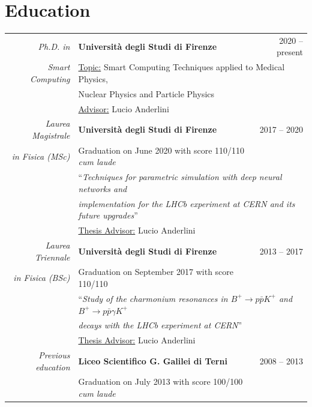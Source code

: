 \documentclass[a4, 11pt]{report}
\begin{document}
    \section*{Education}
        \begin{tabular*}{\textwidth}{rl @{\extracolsep{\fill}} r}
            \textit{Ph.D. in}  
            & {\textbf {Università degli Studi di Firenze}}
            & {\small 2020 -- present}\\
            \textit{Smart Computing}
            & \multicolumn{2}{l}{\small {\ul{Topic:} Smart Computing Techniques applied to Medical Physics,}}\\
            & \multicolumn{2}{l}{\small{Nuclear Physics and Particle Physics}}\\
            & {\small{\ul{Advisor:} Lucio Anderlini}}\\ [3mm]
            
            \textit{Laurea Magistrale}  
            & {\textbf {Università degli Studi di Firenze}}
            & {\small 2017 -- 2020}\\
            \textit{in Fisica (MSc)}
            & {\small Graduation on June 2020 with score 110/110 \textit{cum laude}}\\ [1.5mm]
            & \multicolumn{2}{l}{\small{``\textit{Techniques for parametric simulation with deep neural networks and}}}\\
            & \multicolumn{2}{l}{\small{\textit{implementation for the LHCb experiment at CERN and its future upgrades}''}}\\
            & {\small \ul{Thesis Advisor:} Lucio Anderlini}\\ [3mm]
            
            \textit{Laurea Triennale}   
            & {\textbf {Università degli Studi di Firenze}}
            & {\small 2013 -- 2017}\\
            \textit{in Fisica (BSc)}    
            & {\small Graduation on September 2017 with score 110/110}\\ [1.5mm]
            & \multicolumn{2}{l}{``\textit{Study of the charmonium resonances in $B^+ \to p \bar{p} K^+$ and $B^+ \to p \bar{p} \gamma K^+$}}\\
            & \multicolumn{2}{l}{\textit{ decays with the LHCb experiment at CERN}''}\\
            & {\small \ul{Thesis Advisor:} Lucio Anderlini}\\ [3mm]
                                        
            \textit{Previous education} 
            & {\textbf {Liceo Scientifico G. Galilei di Terni}}
            & {\small 2008 -- 2013}\\
            & {\small Graduation on July 2013 with score 100/100 \textit{cum laude}}
        \end{tabular*}
        
\end{document}
